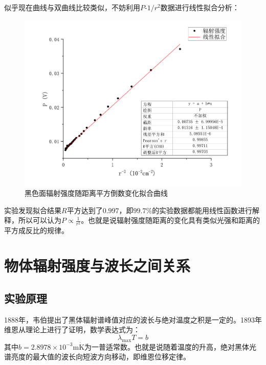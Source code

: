 \documentclass{WHUReport}
\begin{document}
\begin{multicols}{2}
	似乎现在曲线与双曲线比较类似，不妨利用$P\mbox{-}1/r^2$数据进行线性拟合分析：
	\begin{figure}[H]
		\centering
		\includegraphics[width=\linewidth]{figs/PSLG.pdf}
		\caption{黑色面辐射强度随距离平方倒数变化拟合曲线}
	\end{figure}
	实验发现拟合结果$R$平方达到了$0.997$，即$99.7\%$的实验数据都能用线性函数进行解释，所以可以认为$P\propto\frac{1}{r^2}$。也就是说辐射强度随距离的变化具有类似光强和距离的平方成反比的规律。
	\section{物体辐射强度与波长之间关系}
	\subsection{实验原理}
	1888年，韦伯提出了黑体辐射谱峰值对应的波长与绝对温度之积是一定的。1893年维恩从理论上进行了证明，数学表达式为：
	\begin{equation}
		\lambda_{\max}T=b
	\end{equation}
	其中$b=2.8978\times10^{-3}\operatorname{m\dot K}$为一普适常数。也就是说随着温度的升高，绝对黑体光谱亮度的最大值的波长向短波方向移动，即维恩位移定律。

\end{multicols}
\end{document}
